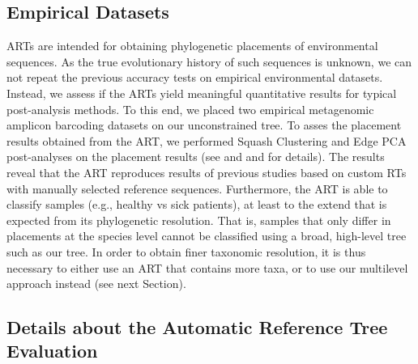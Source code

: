 
\subsection{Empirical Datasets}
\label{sec:Results:sub:EmpiricalDatasets}

\acp{ART} are intended for obtaining phylogenetic placements of environmental sequences.
As the true evolutionary history of such sequences is unknown,
we can not repeat the previous accuracy tests on empirical environmental datasets.
Instead, we assess if the \acp{ART} yield meaningful quantitative results for typical post-analysis methods.
To this end, we placed two empirical metagenomic amplicon barcoding datasets on our unconstrained  tree.
To asses the placement results obtained from the \ac{ART},
we performed Squash Clustering and Edge PCA \citep{Matsen2011a} post-analyses on the placement results
(see  and
 and  for details).
The results reveal that the \ac{ART} reproduces results of previous studies
based on custom \acp{RT} with manually selected reference sequences.
Furthermore, the \ac{ART} is able to classify samples (e.g., healthy vs sick patients),
at least to the extend that is expected from its phylogenetic resolution.
That is, samples that only differ in placements at the species level
cannot be classified using a broad, high-level tree such as our  tree.
In order to obtain finer taxonomic resolution, it is thus necessary to either use an \ac{ART} that contains more taxa,
or to use our multilevel approach instead (see next Section).


\subsection{Details about the Automatic Reference Tree Evaluation}
\label{sec:DetailsEvaluationReferenceTrees}

